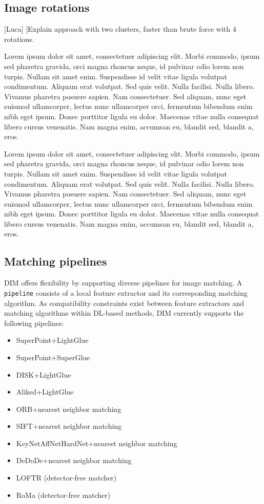 \subsection{Image rotations}
[Luca] [Explain approach with two clusters, faster than brute force with 4 rotations. 

Lorem ipsum dolor sit amet, consectetuer adipiscing elit. Morbi commodo, ipsum sed pharetra gravida, orci magna rhoncus neque, id pulvinar odio lorem non turpis. Nullam sit amet enim. Suspendisse id velit vitae ligula volutpat condimentum. Aliquam erat volutpat. Sed quis velit. Nulla facilisi. Nulla libero. Vivamus pharetra posuere sapien. Nam consectetuer. Sed aliquam, nunc eget euismod ullamcorper, lectus nunc ullamcorper orci, fermentum bibendum enim nibh eget ipsum. Donec porttitor ligula eu dolor. Maecenas vitae nulla consequat libero cursus venenatis. Nam magna enim, accumsan eu, blandit sed, blandit a, eros.

Lorem ipsum dolor sit amet, consectetuer adipiscing elit. Morbi commodo, ipsum sed pharetra gravida, orci magna rhoncus neque, id pulvinar odio lorem non turpis. Nullam sit amet enim. Suspendisse id velit vitae ligula volutpat condimentum. Aliquam erat volutpat. Sed quis velit. Nulla facilisi. Nulla libero. Vivamus pharetra posuere sapien. Nam consectetuer. Sed aliquam, nunc eget euismod ullamcorper, lectus nunc ullamcorper orci, fermentum bibendum enim nibh eget ipsum. Donec porttitor ligula eu dolor. Maecenas vitae nulla consequat libero cursus venenatis. Nam magna enim, accumsan eu, blandit sed, blandit a, eros.

\subsection{Matching pipelines}

DIM offers flexibility by supporting diverse pipelines for image matching. 
A \texttt{pipeline} consists of a local feature extractor and its corresponding matching algorithm. 
As compatibility constraints exist between feature extractors and matching algorithms within DL-based methods, DIM currently supports the following pipelines:
\begin{itemize}
    \item SuperPoint+LightGlue
    \item SuperPoint+SuperGlue
    \item DISK+LightGlue
    \item Aliked+LightGlue
    \item ORB+nearest neighbor matching
    \item SIFT+nearest neighbor matching
    \item KeyNetAffNetHardNet+nearest neighbor matching
    \item DeDoDe+nearest neighbor matching
    \item LOFTR (detector-free matcher)
    \item RoMa (detector-free matcher)
\end{itemize}

